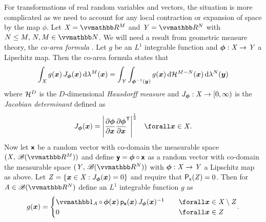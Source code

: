 For transformations of real random variables and vectors, the situation is more complicated as we need to account for any local contraction or expansion of space by the map $\phi$. Let $\set{X} = \reals^M$ and $\set{Y} = \reals^N$ with $N \leq M, \, N,M \in \naturals$. %
We will need a result from geometric measure theory, the \emph{co-area formula} \citep{}. Let $g$ be an $L^1$ integrable function and $\boldsymbol{\phi} : \mathit{X} \to \mathit{Y}$ a Lipschitz map. Then the co-area formula states that
\begin{equation}\label{eq:co-area-formula}
  \int_{\set{X}} 
    g(\vct{x}) \, J_{\vct{\phi}}(\vct{x})
  \,\dr\lambda^{M}(\vct{x}) =
  \int_{\set{Y}} \int_{\vct{\phi}^{-1}(\vct{y})}
    g(\vct{x})
  \,\dr\haum{M-N}(\vct{x})\,\dr\lebm{N}(\vct{y})
\end{equation}
where $\haum{D}$ is the $D$-dimensional \emph{Hausdorff measure}  and $J_{\boldsymbol{\phi}} : \mathit{X} \to [0,\infty)$ is the \emph{Jacobian determinant} defined as
\begin{equation}\label{eq:jacobian-determinant-def}
 J_{\vct{\phi}}(\vct{x}) = 
 \left|\pd{\vct{\phi}}{\vct{x}}\pd{\vct{\phi}}{\vct{x}}\tr\right|^{\frac{1}{2}}
 \quad \forall \vct{x} \in \set{X}.
\end{equation}
Now let $\boldsymbol{\mathsf{x}}$ be a random vector with co-domain the measurable space $(\set{X},\,\borel(\reals^M))$ and define $\boldsymbol{\mathsf{y}} = \boldsymbol{\phi} \circ \boldsymbol{\mathsf{x}}$ as a random vector with co-domain the measurable space $(\set{Y},\,\borel(\reals^N))$ with $\boldsymbol{\phi} : \mathit{X} \to \mathit{Y}$ a Lipschitz map as above. Let $\set{Z} = \lbr \vct{x} \in \set{X} : J_{\vct{\phi}}(\vct{x}) = 0 \rbr$ and require that $\mathsf{P}_{\mathsf{x}}(\mathit{Z}) = 0$. Then for $\set{A} \in \borel(\reals^N)$ define an $L^1$ integrable function $g$ as
\begin{equation}\label{eq:change-of-var-real-vector-derivation-1}
  g(\vct{x}) = 
  \begin{cases}
    \ind{\set{A}}\circ\,\vct{\phi}(\vct{x}) \, \pden{\rvct{x}}(\vct{x}) \, J_{\vct{\phi}}(\vct{x})^{-1}
    & \quad \forall \vct{x} \in \set{X} \setminus \set{Z}\\
    0 & \quad \forall \vct{x} \in \set{Z}
  \end{cases}.
\end{equation}
